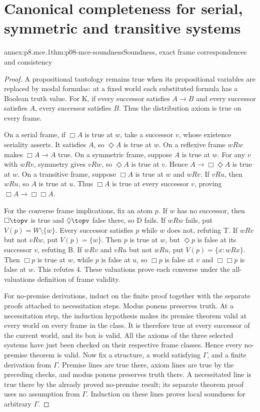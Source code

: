 \section{Canonical completeness for serial, symmetric and transitive systems}

\begin{annexitem}{annex:p8.mce.1}{thm:p08-mce-soundness}{Soundness, exact frame correspondences and consistency}
\begin{proof}
A propositional tautology remains true when its propositional variables
are replaced by modal formulas: at a fixed world each substituted formula
has a Boolean truth value. For K, if every successor satisfies \(A\to B\)
and every successor satisfies \(A\), every successor satisfies \(B\).
Thus the distribution axiom is true on every frame.

On a serial frame, if \(\Box A\) is true at \(w\), take a successor
\(v\), whose existence seriality asserts. It satisfies \(A\), so
\(\Diamond A\) is true at \(w\). On a reflexive frame \(wRw\)
makes \(\Box A\to A\) true. On a symmetric frame, suppose \(A\)
is true at \(w\). For any \(v\) with \(wRv\), symmetry gives
\(vRw\), so \(\Diamond A\) is true at \(v\). Hence
\(A\to\Box\Diamond A\) is true at \(w\). On a transitive frame,
suppose \(\Box A\) is true at \(w\) and \(wRv\). If \(vRu\),
then \(wRu\), so \(A\) is true at \(u\). Thus \(\Box A\) is
true at every successor \(v\), proving \(\Box A\to\Box\Box A\).

For the converse frame implications, fix an atom \(p\). If \(w\)
has no successor, then \(\Box\topv\) is true and
\(\Diamond\topv\) false there, so D fails. If \(wRw\) fails,
put \(V(p)=W\setminus\{w\}\). Every successor satisfies \(p\)
while \(w\) does not, refuting T. If \(wRv\) but not \(vRw\),
put \(V(p)=\{w\}\). Then \(p\) is true at \(w\), but
\(\Diamond p\) is false at its successor \(v\), refuting B.
If \(wRv\) and \(vRu\) but not \(wRu\), put
\(V(p)=\{x:wRx\}\). Then \(\Box p\) is true at \(w\), while
\(p\) is false at \(u\), so \(\Box p\) is false at \(v\) and
\(\Box\Box p\) is false at \(w\). This refutes 4. These valuations
prove each converse under the all-valuations definition of frame validity.

For no-premise derivations, induct on the finite proof together with the
separate proofs attached to necessitation steps. Modus ponens preserves
truth. At a necessitation step, the induction hypothesis makes its premise
theorem valid at every world on every frame in the class. It is therefore
true at every successor of the current world, and its box is valid.
All the axioms of the three selected systems have just been checked on
their respective frame classes. Hence every no-premise theorem is valid.
Now fix a structure, a world satisfying \(\Gamma\), and a finite
derivation from \(\Gamma\). Premise lines are true there, axiom lines
are true by the preceding checks, and modus ponens preserves truth there.
A necessitated line is true there by the already proved no-premise result;
its separate theorem proof uses no assumption from \(\Gamma\).
Induction on these lines proves local soundness for arbitrary \(\Gamma\).


\end{proof}
\end{annexitem}
